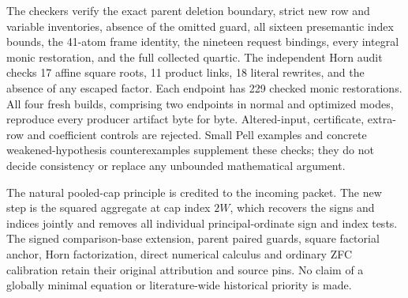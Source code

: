 The checkers verify the exact parent deletion boundary, strict new
row and variable inventories, absence of the omitted guard, all
sixteen presemantic index bounds, the 41-atom frame identity,
the nineteen request bindings, every integral monic restoration,
and the full collected quartic. The independent Horn audit checks
17 affine square roots, 11 product links, 18 literal rewrites,
and the absence of any escaped factor. Each endpoint has 229
checked monic restorations. All four fresh builds, comprising
two endpoints in normal and optimized modes, reproduce every
producer artifact byte for byte. Altered-input, certificate,
extra-row and coefficient controls are rejected. Small Pell
examples and concrete weakened-hypothesis counterexamples
supplement these checks; they do not decide consistency or
replace any unbounded mathematical argument.

The natural pooled-cap principle is credited to the incoming
 packet.
The new step is the squared aggregate at cap index $2W$, which
recovers the signs and indices jointly and removes all individual
principal-ordinate sign and index tests. The signed comparison-base
extension, parent paired guards, square factorial anchor,
Horn factorization, direct numerical calculus and ordinary ZFC
calibration retain their original attribution and source pins.
No claim of a globally minimal equation or literature-wide
historical priority is made.
